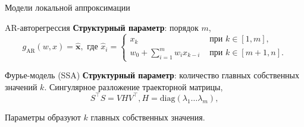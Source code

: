 \documentclass{beamer}
\newcommand{\bx}{\mathbf{x}}
\newcommand{\R}{\mathbb{R}}
\begin{document}

\begin{frame}{Модели локальной аппроксимации}
    \begin{block}{AR-авторегрессия}
        \textbf{Структурный параметр}: порядок $m$,
        $$
        g_{\text{AR}}(w, x) = \hat{\bx}, \text{ где }
        \hat{x}_i = \begin{cases}
            x_k & \text{ при } k \in [1, m], \\
            w_0 + \sum_{i=1}^m w_i x_{k - i} & \text{ при } k \in [m + 1, n].
        \end{cases}
        $$
    \end{block}


\begin{block}{Фурье-модель (SSA)}
    \textbf{Структурный параметр}: количество главных собственных значений $k$.
    Сингулярное разложение траекторной матрицы,
    $$
    S^\intercal S = VHV^\intercal, H = \mathrm{diag}(\lambda_1 \ldots \lambda_m),
    $$

    Параметры образуют $k$ главных собственных значения.
\end{block}
\end{frame}

\end{document}
